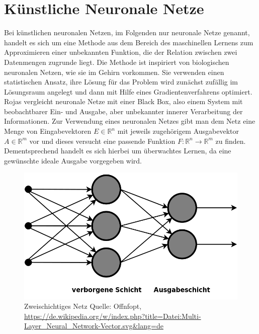 \documentclass[
	12pt,
	a4paper,
	BCOR10mm,
	DIV14,
	listof=totoc,
	bibliography=totoc,
	headsepline
]{scrreprt}
\begin{document}
\section{Künstliche Neuronale Netze}
\label{back_nn}
Bei künstlichen neuronalen Netzen, im Folgenden nur neuronale Netze genannt, handelt es sich um eine Methode aus dem Bereich des maschinellen Lernens zum Approximieren einer unbekannten Funktion, die der Relation zwischen zwei Datenmengen zugrunde liegt. Die Methode ist inspiriert von biologischen neuronalen Netzen, wie sie im Gehirn vorkommen. 
Sie verwenden einen statistischen Ansatz, ihre Lösung für das Problem wird zunächst zufällig im Lösungsraum angelegt und dann mit Hilfe eines Gradientenverfahrens optimiert.
Rojas \cite{Rojas:1996:NNS:235222} vergleicht neuronale Netze mit einer Black Box, also einem System mit beobachtbarer Ein- und Ausgabe, aber unbekannter innerer Verarbeitung der Informationen. 
Zur Verwendung eines neuronalen Netzes gibt man dem Netz eine Menge von Eingabevektoren $E \in \mathbb{R}^n$ mit jeweils zugehörigem Ausgabevektor $A \in \mathbb{R}^m$ vor und dieses versucht eine passende Funktion $F: \mathbb{R}^n \rightarrow \mathbb{R}^m$ zu finden. Dementsprechend handelt es sich hierbei um überwachtes Lernen, da eine gewünschte ideale Ausgabe vorgegeben wird.

\begin{figure}[h]
	\begin{center}
		\includegraphics[totalheight=0.2\textheight]{Bilder/Multi-Layer_Neural_Network-Vector.png}
	\end{center}
	\caption{Zweischichtiges Netz Quelle: Offnfopt, \url{https://de.wikipedia.org/w/index.php?title=Datei:Multi-Layer_Neural_Network-Vector.svg&lang=de}}
	\label{fig:Schichten}
\end{figure}
\end{document}
